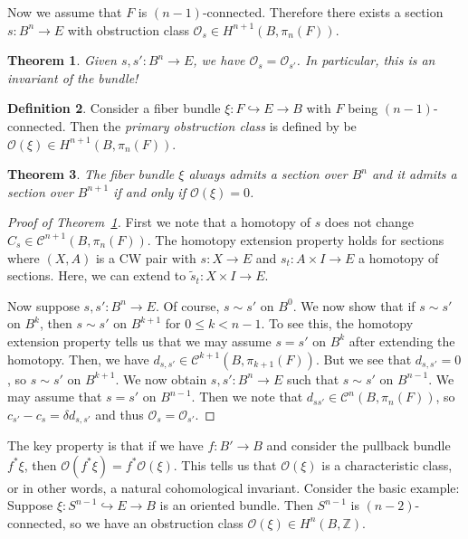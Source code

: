 \documentclass[leqno, openany]{memoir}
\newtheorem{thm}{Theorem}[section]
\theoremstyle{definition}
\newtheorem{defn}[thm]{Definition}
\theoremstyle{remark}
\theoremstyle{plain}
\theoremstyle{definition}
\theoremstyle{remark}
\newcommand{\Z}{\mathbb{Z}}
\newcommand{\mc}[1]{\mathcal{#1}}
\newcommand{\wt}[1]{\widetilde{#1}}
\begin{document}
Now we assume that $F$ is $(n-1)$-connected. Therefore there exists a section
$s \colon B^n \to E$ with obstruction class $\mc{O}_s \in H^{n+1}(B,
\pi_n(F))$.

\begin{thm}\label{thm:obstA} Given $s, s' \colon B^n \to E$, we have $\mc{O}_s
= \mc{O}_{s'}$. In particular, this is an \textit{invariant} of the bundle!
\end{thm}

\begin{defn} Consider a fiber bundle $\xi \colon F \hookrightarrow E \to B$
with $F$ being $(n-1)$-connected. Then the \textit{primary obstruction class}
is defined by be $\mc{O}(\xi) \in H^{n+1}(B, \pi_n(F))$.  \end{defn}

\begin{thm} The fiber bundle $\xi$ always admits a section over $B^n$ and it
admits a section over $B^{n+1}$ if and only if $\mc{O}(\xi) = 0$.  \end{thm}

\begin{proof}[Proof of Theorem~\ref{thm:obstA}] First we note that a homotopy
    of $s$ does not change $C_s \in \mc{C}^{n+1}(B, \pi_n(F))$. The homotopy
    extension property holds for sections where $(X, A)$ is a CW pair with $s
    \colon X \to E$ and $s_t \colon A \times I \to E$ a homotopy of sections.
    Here, we can extend to $\wt{s}_t \colon X \times I \to E$.

    Now suppose $s, s' \colon B^n \to E$. Of course, $s \sim s'$ on $B^0$. We
now show that if $s \sim s'$ on $B^k$, then $s \sim s'$ on $B^{k+1}$ for $0
\leq k < n-1$. To see this, the homotopy extension property tells us that we
may assume $s = s'$ on $B^k$ after extending the homotopy. Then, we have
$d_{s,s'} \in \mc{C}^{k+1}(B, \pi_{k+1}(F))$. But we see that $d_{s,s'} = 0$,
so $s \sim s'$ on $B^{k+1}$. We now obtain $s, s' \colon B^n \to E$ such that
$s \sim s'$ on $B^{n-1}$. We may assume that $s = s'$ on $B^{n-1}$. Then we
note that $d_{ss'} \in \mc{C}^n(B, \pi_n(F))$, so $c_{s'} - c_s = \delta
d_{s,s'}$ and thus $\mc{O}_s = \mc{O}_{s'}$.  \end{proof}

The key property is that if we have $f \colon B' \to B$ and consider the
pullback bundle $f^* \xi$, then $\mc{O}(f^* \xi) = f^* \mc{O}(\xi)$. This tells
us that $\mc{O}(\xi)$ is a characteristic class, or in other words, a natural
cohomological invariant. Consider the basic example: Suppose $\xi \colon
S^{n-1} \hookrightarrow E \to B$ is an oriented bundle. Then $S^{n-1}$ is
$(n-2)$-connected, so we have an obstruction class $\mc{O}(\xi) \in H^n(B,
\Z)$.
\end{document}
